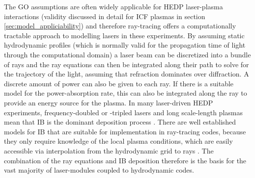 The \ac{GO} assumptions are often widely applicable for \ac{HEDP} laser-plasma interactions (validity discussed in detail for \ac{ICF} plasmas in section \ref{sec:model_appliciability}) and therefore ray-tracing offers a computationally tractable approach to modelling lasers in these experiments.
By assuming static hydrodynamic profiles (which is normally valid for the propagation time of light through the computational domain) a laser beam can be discretized into a bundle of rays and the ray equations can then be integrated along their path to solve for the trajectory of the light, assuming that refraction dominates over diffraction.
A discrete amount of power can also be given to each ray.
If there is a suitable model for the power-absorption rate, this can also be integrated along the ray to provide an energy source for the plasma.
In many laser-driven \ac{HEDP} experiments, frequency-doubled or -tripled lasers and long scale-length plasmas mean that \ac{IB} is the dominant deposition process \cite{schmitt_importance_2023,schmitt_importance_2023-1}.
There are well established models for \ac{IB} that are suitable for implementation in ray-tracing codes, because they only require knowledge of the local plasma conditions, which are easily accessible via interpolation from the hydrodynamic grid to rays \cite{huba_nrl_2013,johnston_correct_1973}.
The combination of the ray equations and \ac{IB} deposition therefore is the basis for the vast majority of laser-modules coupled to hydrodynamic codes.

